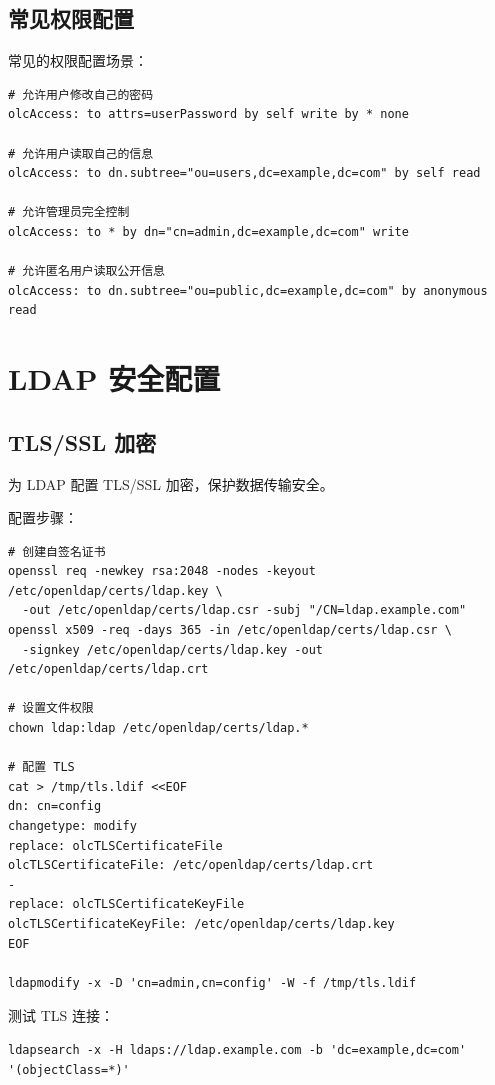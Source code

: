 \documentclass[12pt,UTF8]{ctexbook}
\begin{document}
\section{常见权限配置}
\label{sec:common_permissions}

常见的权限配置场景：

\begin{verbatim}
# 允许用户修改自己的密码
olcAccess: to attrs=userPassword by self write by * none

# 允许用户读取自己的信息
olcAccess: to dn.subtree="ou=users,dc=example,dc=com" by self read

# 允许管理员完全控制
olcAccess: to * by dn="cn=admin,dc=example,dc=com" write

# 允许匿名用户读取公开信息
olcAccess: to dn.subtree="ou=public,dc=example,dc=com" by anonymous read
\end{verbatim}

\chapter{LDAP 安全配置}
\label{chap:ldap_security}

\section{TLS/SSL 加密}
\label{sec:tls_ssl}

为 LDAP 配置 TLS/SSL 加密，保护数据传输安全。

配置步骤：

\begin{verbatim}
# 创建自签名证书
openssl req -newkey rsa:2048 -nodes -keyout /etc/openldap/certs/ldap.key \
  -out /etc/openldap/certs/ldap.csr -subj "/CN=ldap.example.com"
openssl x509 -req -days 365 -in /etc/openldap/certs/ldap.csr \
  -signkey /etc/openldap/certs/ldap.key -out /etc/openldap/certs/ldap.crt

# 设置文件权限
chown ldap:ldap /etc/openldap/certs/ldap.*

# 配置 TLS
cat > /tmp/tls.ldif <<EOF
dn: cn=config
changetype: modify
replace: olcTLSCertificateFile
olcTLSCertificateFile: /etc/openldap/certs/ldap.crt
-
replace: olcTLSCertificateKeyFile
olcTLSCertificateKeyFile: /etc/openldap/certs/ldap.key
EOF

ldapmodify -x -D 'cn=admin,cn=config' -W -f /tmp/tls.ldif
\end{verbatim}

测试 TLS 连接：
\begin{verbatim}
ldapsearch -x -H ldaps://ldap.example.com -b 'dc=example,dc=com' '(objectClass=*)'
\end{verbatim}
\end{document}
